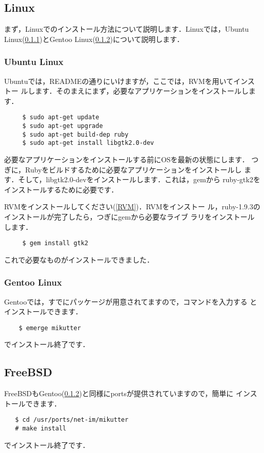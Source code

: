\documentclass{jsarticle}
\begin{document}
  \subsection{Linux} \label{linux}
  まず，Linuxでのインストール方法について説明します．Linuxでは，Ubuntu
  Linux(\ref{ubuntu})とGentoo Linux(\ref{gentoo})について説明します．

   \subsubsection{Ubuntu Linux} \label{ubuntu}
   Ubuntuでは，READMEの通りにいけますが，ここでは，RVMを用いてインストー
   ルします．そのまえにまず，必要なアプリケーションをインストールします．
    \begin{lstlisting}
     $ sudo apt-get update
     $ sudo apt-get upgrade
     $ sudo apt-get build-dep ruby
     $ sudo apt-get install libgtk2.0-dev
    \end{lstlisting}
    必要なアプリケーションをインストールする前にOSを最新の状態にします．
    つぎに，Rubyをビルドするために必要なアプリケーションをインストールし
    ます．そして，libgtk2.0-devをインストールします．これは，gemから
    ruby-gtk2をインストールするために必要です．

    RVMをインストールしてください(\ref{RVM})．RVMをインストー
    ル，ruby-1.9.3のインストールが完了したら，つぎにgemから必要なライブ
    ラリをインストールします．
    \begin{lstlisting}
     $ gem install gtk2
    \end{lstlisting}
    これで必要なものがインストールできました．

   \subsubsection{Gentoo Linux} \label{gentoo}
   Gentooでは，すでにパッケージが用意されてますので，コマンドを入力する
   とインストールできます．
   \begin{lstlisting}
    $ emerge mikutter
   \end{lstlisting}
   でインストール終了です．
  \subsection{FreeBSD} \label{freebsd}
  FreeBSDもGentoo(\ref{gentoo})と同様にportsが提供されていますので，簡単に
  インストールできます．
  \begin{lstlisting}
   $ cd /usr/ports/net-im/mikutter
   # make install
  \end{lstlisting}
  でインストール終了です．
\end{document}
